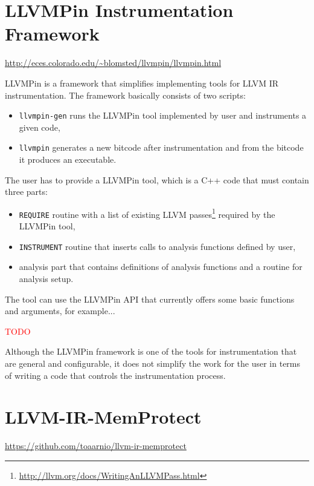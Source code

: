 \section{LLVMPin Instrumentation Framework}

\url{http://eces.colorado.edu/~blomsted/llvmpin/llvmpin.html}
\medskip

LLVMPin is a framework that simplifies implementing tools for LLVM IR
instrumentation. The framework basically consists of two scripts:

\begin{itemize}
    \item \texttt{llvmpin-gen} runs the LLVMPin tool implemented by
          user and instruments a given code, 
    \item \texttt{llvmpin} generates a new
	  bitcode after instrumentation and from the bitcode it produces an
          executable.
\end{itemize}

The user has to provide a LLVMPin tool, which is a C++ code that must contain three
parts:

\begin{itemize}
    \item \texttt{REQUIRE} routine with a list of existing LLVM
          passes\footnote{\url{http://llvm.org/docs/WritingAnLLVMPass.html}} required by
          the LLVMPin tool,
    \item \texttt{INSTRUMENT} routine that inserts calls to analysis functions
          defined by user,
    \item analysis part that contains definitions of analysis functions and a
          routine for analysis setup.
\end{itemize}

The tool can use the LLVMPin API that currently offers some basic functions and
arguments, for example...

\textcolor{red}{TODO}

Although the LLVMPin framework is one of the tools for instrumentation that are
general and configurable, it does not simplify the work for the user in terms
of writing a code that controls the instrumentation process.

\section{LLVM-IR-MemProtect}

\url{https://github.com/toaarnio/llvm-ir-memprotect}

